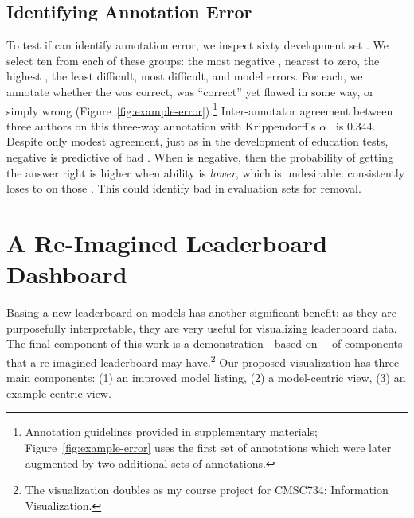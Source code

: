 \subsection{Identifying Annotation Error}

To test if \irt{} can identify annotation error, we inspect sixty \squad{} development set \itms{}.
We select ten \itms{} from each of these groups: the most negative \discability{}, \discability{} nearest to zero, the highest \discability{}, the least difficult, most difficult, and \irt{} model errors.
For each, we annotate whether the \itm{} was correct, was ``correct'' yet flawed in some way, or simply wrong (Figure~\ref{fig:example-error}).\footnote{
    Annotation guidelines provided in supplementary materials; Figure~\ref{fig:example-error} uses the first set of annotations which were later augmented by two additional sets of annotations.
}
Inter-annotator agreement between three authors on this three-way annotation with Krippendorff's $\alpha$~\citep{kripp2004,artstein2008inter} is $0.344$.
Despite only modest agreement, just as in the development of education tests, negative \discability{} is predictive of bad \itms{}.
When \discability{} is negative, then the probability of getting
the answer right is higher when ability is \emph{lower}, which is
undesirable: \smart{} consistently loses to \dumb{} on those \itms{}.
This could identify bad \itms{} in evaluation sets for removal.
\begin{figure*}[t]
    \centering
    \caption{
        We annotate \squad{} \itms{} by \discability{}, \diff{}, and \irt{} prediction errors.
        For example, one question with negative \discability{} was classified as ``Wrong'' with the explanation that the annotated answer indicates it is  answerable, but the question actually  answerable.
        \Itms{} with negative \discability{} or where \irt{}'s prediction is wrong have a much higher rate of annotation error (``Flawed'' or ``Wrong'').
        Using similar methodology, errors in datasets could be more rapidly identified.
    }
    \label{fig:example-error}
\end{figure*}
\section{A Re-Imagined Leaderboard Dashboard}
\label{ch:isicle:vis}

Basing a new leaderboard on \irt{} models has another significant benefit: as they are purposefully interpretable, they are very useful for visualizing leaderboard data.
The final component of this work is a demonstration---based on \squad{}---of components that a re-imagined leaderboard may have.\footnote{
    The visualization doubles as my course project for CMSC734: Information Visualization.
}
Our proposed visualization has three main components: (1) an improved model listing, (2) a model-centric view, (3) an example-centric view.

